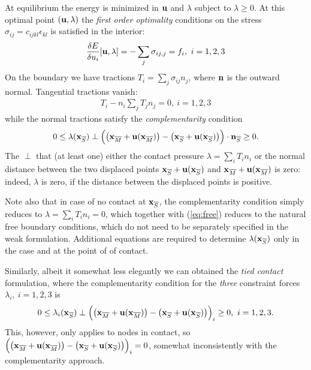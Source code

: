 \documentclass[11pt]{article}
\newcommand{\vecx}{{\bf x}}
\newcommand{\vecu}{{\bf u}}
\newcommand{\vecn}{{\bf n}}
\begin{document}
At equilibrium the energy is minimized in $\vecu$ and $\lambda$ subject to $\lambda \geq 0$.
At this optimal point $(\vecu, \lambda)$ the \emph{first order optimality} conditions on the stress $\sigma_{ij} = c_{ijkl}\epsilon_{kl}$ is satisfied in the interior:
\begin{gather}
  \label{eq:bulk}
  \frac{\delta E}{\delta u_i}[\vecu,\lambda] = -\sum_j \sigma_{ij,j} = f_i,\ i = 1,2,3
\end{gather}
On the boundary we have tractions $T_i = \sum_j \sigma_{ij} n_j$, where $\vecn$ is the outward normal.
Tangential tractions vanish:
\begin{gather}
 \label{eq:free}
  T_i - n_i \sum_j T_j n_j = 0,\ i = 1,2,3
\end{gather}
while the normal tractions satisfy the \emph{complementarity} condition
\begin{equation}
\label{eq:complementarity}
0 \leq \lambda({\vecx_{\overline S}}) \perp \Bigl(\bigl(\vecx_{\overline M} + \vecu(\vecx_{\overline M})\bigr) - \bigl(\vecx_{\overline S} + \vecu(\vecx_{\overline S})\bigr)\Bigr) \cdot \vecn_{\overline S} \geq 0.
\end{equation}
The $\perp$ that (at least one) either the contact pressure $\lambda = \sum_i T_i n_i$ or the normal distance between the two displaced points $\vecx_{\overline S}+\vecu(\vecx_{\overline S})$ and $\vecx_{\overline M}+\vecu(\vecx_{\overline M})$ is zero:
indeed, $\lambda$ is zero, if the distance between the displaced points is positive.

Note also that in case of no contact at $\vecx_{\overline S}$, the complementarity condition simply reduces to $\lambda = \sum_i T_i n_i = 0$, which together with (\ref{eq:free}) reduces to the natural free boundary
conditions, which do not need to be separately specified in the weak formulation.
Additional equations are required to determine $\lambda(\vecx_{\overline S})$ only in the case and at the point of of contact.

Similarly, albeit it somewhat less elegantly we can obtained the \emph{tied contact} formulation, where the complementarity condition for the \emph{three} constraint forces $\lambda_i,\ i = 1,2,3$ is
\begin{equation}
\label{eq:tied-complementarity}
0 \leq \lambda_i({\vecx_{\overline S}}) \perp \Bigl(\bigl(\vecx_{\overline M} + \vecu(\vecx_{\overline M})\bigr) - \bigl(\vecx_{\overline S} + \vecu(\vecx_{\overline S})\bigr)\Bigr)_i \geq 0,\ i = 1,2,3.
\end{equation}
This, however, only applies to nodes in contact, so $\Bigl(\bigl(\vecx_{\overline M} + \vecu(\vecx_{\overline M})\bigr) - \bigl(\vecx_{\overline S} + \vecu(\vecx_{\overline S})\bigr)\Bigr)_i = 0$, somewhat inconsistently
with the complementarity approach.
\end{document}

